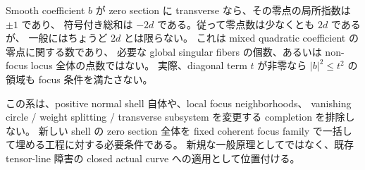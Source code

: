 Smooth coefficient $b$ が zero section に transverse なら、その零点の局所指数は $\pm1$ であり、
符号付き総和は $-2d$ である。従って零点数は少なくとも $2d$ であるが、
一般にはちょうど $2d$ とは限らない。
これは mixed quadratic coefficient の零点に関する数であり、
必要な global singular fibers の個数、あるいは non-focus locus 全体の点数ではない。
実際、diagonal term $t$ が非零なら $|b|^2\le t^2$ の領域も focus 条件を満たさない。

この系は、positive normal shell 自体や、local focus neighborhoods、
vanishing circle / weight splitting / transverse subsystem を変更する completion を排除しない。
新しい shell の zero section 全体を fixed coherent focus family で一括して埋める工程に対する必要条件である。
新規な一般原理としてではなく、既存 tensor-line 障害の closed actual curve への適用として位置付ける。
